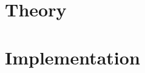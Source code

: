 
%



\frontmatter



\mainmatter
\tableofcontents

\part{Theory}




\part{Implementation}









{\small}

\appendix
\appendixpage*


\backmatter



